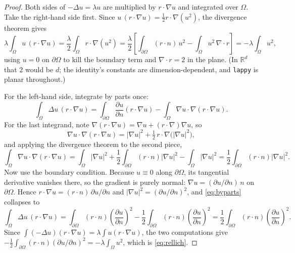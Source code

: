 \documentclass[11pt]{article}
\theoremstyle{definition}
\theoremstyle{remark}
\newcommand{\Om}{\Omega}
\newcommand{\pd}[2]{\frac{\partial #1}{\partial #2}}
\newcommand{\R}{\mathbb{R}}
\newcommand{\code}[1]{\texttt{#1}}
\begin{document}
\begin{proof}
Both sides of $-\Delta u=\lambda u$ are multiplied by $r\cdot\nabla u$ and
integrated over $\Om$. Take the right-hand side first. Since
$u\,(r\cdot\nabla u)=\tfrac12 r\cdot\nabla(u^2)$, the divergence theorem gives
\begin{equation}
  \lambda\!\int_\Om u\,(r\cdot\nabla u)
  = \frac{\lambda}{2}\int_\Om r\cdot\nabla(u^2)
  = \frac{\lambda}{2}\left[\int_{\partial\Om}(r\cdot n)\,u^2
      - \int_\Om u^2\,\nabla\!\cdot\! r\right]
  = -\lambda\!\int_\Om u^2 ,
\end{equation}
using $u=0$ on $\partial\Om$ to kill the boundary term and $\nabla\cdot r=2$ in
the plane. (In $\R^d$ that $2$ would be $d$; the identity's constants are
dimension-dependent, and \code{lappy} is planar throughout.)

For the left-hand side, integrate by parts once:
\begin{equation}\label{eq:byparts}
  \int_\Om \Delta u\,(r\cdot\nabla u)
  = \int_{\partial\Om}\pd{u}{n}(r\cdot\nabla u)
    - \int_\Om \nabla u\cdot\nabla(r\cdot\nabla u).
\end{equation}
For the last integrand, note $\nabla(r\cdot\nabla u)=\nabla u+(r\cdot\nabla)\nabla u$,
so
\begin{equation}
  \nabla u\cdot\nabla(r\cdot\nabla u)
  = |\nabla u|^2 + \tfrac12\, r\cdot\nabla\big(|\nabla u|^2\big),
\end{equation}
and applying the divergence theorem to the second piece,
\begin{equation}
  \int_\Om \nabla u\cdot\nabla(r\cdot\nabla u)
  = \int_\Om|\nabla u|^2
    + \frac12\int_{\partial\Om}(r\cdot n)|\nabla u|^2
    - \int_\Om|\nabla u|^2
  = \frac12\int_{\partial\Om}(r\cdot n)|\nabla u|^2 .
\end{equation}
Now use the boundary condition. Because $u\equiv0$ along $\partial\Om$, its
tangential derivative vanishes there, so the gradient is purely normal:
$\nabla u=(\partial u/\partial n)\,n$ on $\partial\Om$. Hence
$r\cdot\nabla u=(r\cdot n)\,\partial u/\partial n$ and
$|\nabla u|^2=(\partial u/\partial n)^2$, and \eqref{eq:byparts} collapses to
\begin{equation}
  \int_\Om \Delta u\,(r\cdot\nabla u)
  = \int_{\partial\Om}(r\cdot n)\left(\pd{u}{n}\right)^{\!2}
    - \frac12\int_{\partial\Om}(r\cdot n)\left(\pd{u}{n}\right)^{\!2}
  = \frac12\int_{\partial\Om}(r\cdot n)\left(\pd{u}{n}\right)^{\!2}.
\end{equation}
Since $\int(-\Delta u)(r\cdot\nabla u)=\lambda\int u(r\cdot\nabla u)$, the two
computations give
$-\tfrac12\int_{\partial\Om}(r\cdot n)(\partial u/\partial n)^2
 = -\lambda\int_\Om u^2$, which is \eqref{eq:rellich}.
\end{proof}
\end{document}
